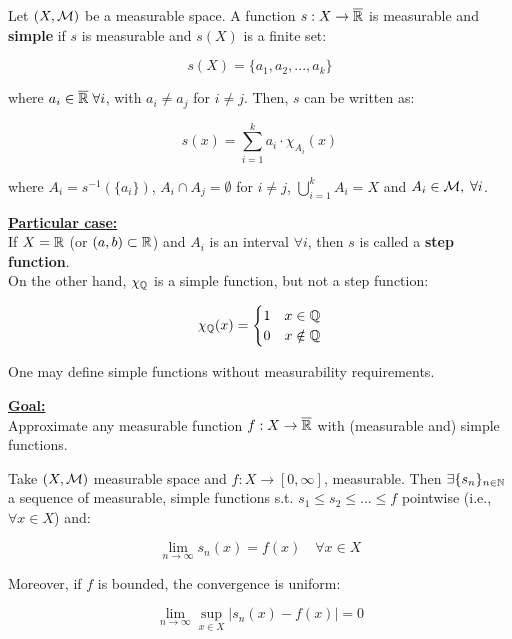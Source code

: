 \begin{fdefinition}
    Let $(X, \mathcal{M})$ be a measurable space. A function $s: X \to \overline{\mathbb{R}}$ is 
    measurable and \textbf{simple} if $s$ is measurable and $s(X)$ is a finite set:

    $$s(X) = \{a_1, a_2, ..., a_k\}$$

    where $a_i \in \overline{\mathbb{R}} \; \forall i$, with $a_i \neq a_j$ for $i \neq j$.
    Then, $s$ can be written as:

    $$s(x) = \sum_{i=1}^{k} a_i \cdot \chi_{A_i}(x)$$

    where $A_i = s^{-1}(\{a_i\})$, $A_i \cap A_j = \emptyset$ for $i \neq j$,
    $\bigcup_{i=1}^{k} A_i = X$ and $A_i \in \mathcal{M}, \; \forall i$.
\end{fdefinition}

\textbf{\underline{Particular case:}}\\

If $X = \mathbb{R}$ (or $(a, b) \subset \mathbb{R}$) and $A_i$ is an interval $\forall i$, 
then $s$ is called a \textbf{step function}.\\

On the other hand, $\chi_{\mathbb{Q}}$ is a simple function, but not a step function:

$$\chi_{\mathbb{Q}}(x) = \begin{cases} 1 & x \in \mathbb{Q} \\ 0 & x \notin \mathbb{Q} \end{cases}$$

\begin{fremark}
    One may define simple functions without measurability requirements. 
\end{fremark}

\vspace{1em}

\textbf{\underline{Goal:}}\\
Approximate any measurable function $f: X \to \overline{\mathbb{R}}$ with (measurable and) 
simple functions.

\begin{ftheorem}

    Take $(X, \mathcal{M})$ measurable space and $f: X \to [0, \infty]$, measurable.
    Then $\exists \{s_n\}_{n \in \mathbb{N}}$ a sequence of measurable, simple functions
    s.t. $s_1 \leq s_2 \leq ... \leq f$ pointwise (i.e., $\forall x \in X$) and:

    $$\lim_{n \to \infty} s_n(x) = f(x) \quad \forall x \in X$$

    Moreover, if $f$ is bounded, the convergence is uniform:

    $$\lim_{n \to \infty} \sup_{x \in X} |s_n(x) - f(x)| = 0$$
\end{ftheorem}

